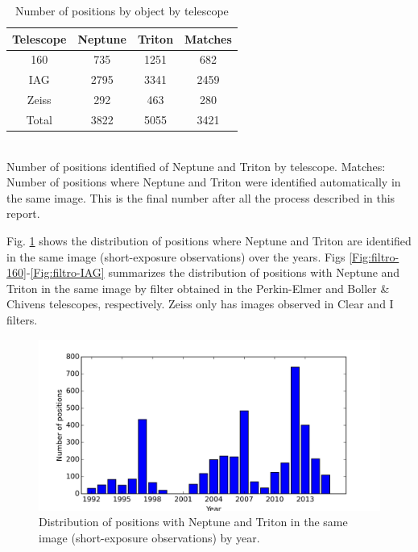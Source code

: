 \documentclass[12pt,a4paper]{report}
\newcommand{\PE}{Perkin-Elmer }
\newcommand{\BC}{Boller \& Chivens }
\begin{document}
\begin{table}[h]
\centering
\caption{Number of positions by object by telescope}
\label{Tab:dados}
\begin{tabular}{|c|c|c|c|}
\hline 
Telescope & Neptune & Triton & Matches \\ 
\hline
160 & 735 & 1251 & 682 \\
\hline
IAG & 2795 & 3341 & 2459 \\ 
\hline 
Zeiss & 292 & 463 & 280 \\ 
\hline 
Total & 3822 & 5055 & 3421 \\ 
\hline 
\end{tabular}
\\Number of positions identified of Neptune and Triton by telescope. Matches: Number of positions where Neptune and Triton were identified automatically in the same image. This is the final number after all the process described in this report.
\end{table}



Fig. \ref{Fig:pos-dist} shows the distribution of positions where Neptune and Triton are identified in the same image (short-exposure observations) over the years. Figs \ref{Fig:filtro-160}-\ref{Fig:filtro-IAG} summarizes the distribution of positions with Neptune and Triton in the same image by filter obtained in the \PE and \BC telescopes, respectively. Zeiss only has images observed in Clear and I filters.

\begin{figure}
\includegraphics[width=16.0cm]{pos-distribution.png} 
\caption{Distribution of positions with Neptune and Triton in the same image (short-exposure observations) by year.}
\label{Fig:pos-dist}
\end{figure}
\end{document}
